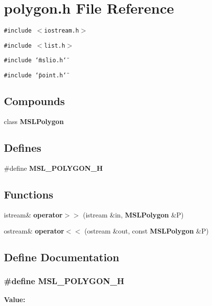 \section{polygon.h File Reference}
\label{polygon_8h}
{\tt \#include $<$iostream.h$>$}\par
{\tt \#include $<$list.h$>$}\par
{\tt \#include \char`\"{}mslio.h\char`\"{}}\par
{\tt \#include \char`\"{}point.h\char`\"{}}\par
\subsection*{Compounds}
\begin{CompactItemize}
\item 
class {\bf MSLPolygon}
\end{CompactItemize}
\subsection*{Defines}
\begin{CompactItemize}
\item 
\#define {\bf MSL\_\-POLYGON\_\-H}
\end{CompactItemize}
\subsection*{Functions}
\begin{CompactItemize}
\item 
istream\& {\bf operator$>$$>$} (istream \&in, {\bf MSLPolygon} \&P)
\item 
ostream\& {\bf operator$<$$<$} (ostream \&out, const {\bf MSLPolygon} \&P)
\end{CompactItemize}


\subsection{Define Documentation}
\subsubsection{\setlength{\rightskip}{0pt plus 5cm}\#define MSL\_\-POLYGON\_\-H}\label{polygon_8h_a0}


{\bf Value:}\footnotesize\begin{verbatim}
\end{verbatim}\normalsize 


